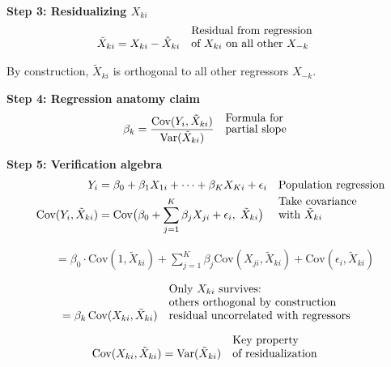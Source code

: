 \documentclass[12pt]{article}
\begin{document}
\vspace{1em}
\noindent \textbf{Step 3: Residualizing $X_{ki}$}  
\begin{align}
\tilde{X}_{ki} &= X_{ki} - \hat{X}_{ki} && \text{\shortstack[l]{Residual from regression \\ of $X_{ki}$ on all other $X_{-k}$}} 
\end{align}

\noindent By construction, $\tilde{X}_{ki}$ is orthogonal to all other regressors $X_{-k}$.

\vspace{1em}
\noindent \textbf{Step 4: Regression anatomy claim}  
\begin{align}
\beta_k &= \frac{\text{Cov}(Y_i, \tilde{X}_{ki})}{\text{Var}(\tilde{X}_{ki})} && \text{\shortstack[l]{Formula for \\ partial slope}} 
\end{align}

\vspace{1em}
\noindent \textbf{Step 5: Verification algebra}  
\begin{align}
Y_i &= \beta_0 + \beta_1 X_{1i} + \dots + \beta_K X_{Ki} + \epsilon_i && \text{\shortstack[l]{Population regression}} \\
\text{Cov}(Y_i, \tilde{X}_{ki}) 
    &= \text{Cov}\big(\beta_0 + \sum_{j=1}^K \beta_j X_{ji} + \epsilon_i, \; \tilde{X}_{ki}\big) && \text{\shortstack[l]{Take covariance \\ with $\tilde{X}_{ki}$}}
\end{align}

\begin{align}
&= \beta_0 \cdot \text{Cov}(1, \tilde{X}_{ki}) 
   + \sum_{j=1}^K \beta_j \text{Cov}(X_{ji}, \tilde{X}_{ki})
   + \text{Cov}(\epsilon_i, \tilde{X}_{ki}) 
\end{align}

\begin{align}
&= \beta_k \,\text{Cov}(X_{ki}, \tilde{X}_{ki}) && \text{\shortstack[l]{Only $X_{ki}$ survives: \\ others orthogonal by construction \\ residual uncorrelated with regressors}} 
\end{align}

\begin{align}
\text{Cov}(X_{ki}, \tilde{X}_{ki}) &= \text{Var}(\tilde{X}_{ki}) && \text{\shortstack[l]{Key property \\ of residualization}} 
\end{align}
\end{document}
